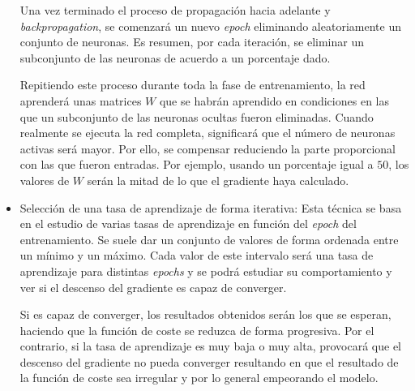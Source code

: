 \begin{itemize}
    Una vez terminado el proceso de propagación hacia adelante y \textit{backpropagation}, se comenzará un nuevo \textit{epoch} eliminando aleatoriamente un conjunto de neuronas. Es resumen, por cada iteración, se eliminar un subconjunto de las neuronas de acuerdo a un porcentaje dado.
    \newline
    
    Repitiendo este proceso durante toda la fase de entrenamiento, la red aprenderá unas matrices $W$ que se habrán aprendido en condiciones en las que un subconjunto de las neuronas ocultas fueron eliminadas. Cuando realmente se ejecuta la red completa, significará que el número de neuronas activas será mayor. Por ello, se compensar reduciendo la parte proporcional con las que fueron entradas. Por ejemplo, usando un porcentaje igual a $50$, los valores de $W$ serán la mitad de lo que el gradiente haya calculado.
    
    \item Selección de una tasa de aprendizaje de forma iterativa: Esta técnica se basa en el estudio de varias tasas de aprendizaje en función del \textit{epoch} del entrenamiento. Se suele dar un conjunto de valores de forma ordenada entre un mínimo y un máximo. Cada valor de este intervalo será una tasa de aprendizaje para distintas \textit{epochs} y se podrá estudiar su comportamiento y ver si el descenso del gradiente es capaz de converger. 
    \newline
    
    Si es capaz de converger, los resultados obtenidos serán los que se esperan, haciendo que la función de coste se reduzca de forma progresiva. Por el contrario, si la tasa de aprendizaje es muy baja o muy alta, provocará que el descenso del gradiente no pueda converger resultando en que el resultado de la función de coste sea irregular y por lo general empeorando el modelo.

\end{itemize}

